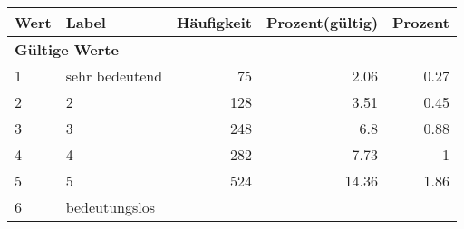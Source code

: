      \begin{longtable}{lXrrr}
     \toprule
     \textbf{Wert} & \textbf{Label} & \textbf{Häufigkeit} & \textbf{Prozent(gültig)} & \textbf{Prozent} \\
     \endhead
     \midrule
     \multicolumn{5}{l}{\textbf{Gültige Werte}}\\

     1 &
     \multicolumn{1}{X}{ sehr bedeutend   } &


       \num{75} &
       \num[round-mode=places,round-precision=2]{2.06} &
         \num[round-mode=places,round-precision=2]{0.27} \\

     2 &
     \multicolumn{1}{X}{ 2   } &


       \num{128} &
       \num[round-mode=places,round-precision=2]{3.51} &
         \num[round-mode=places,round-precision=2]{0.45} \\

     3 &
     \multicolumn{1}{X}{ 3   } &


       \num{248} &
       \num[round-mode=places,round-precision=2]{6.8} &
         \num[round-mode=places,round-precision=2]{0.88} \\

     4 &
     \multicolumn{1}{X}{ 4   } &


       \num{282} &
       \num[round-mode=places,round-precision=2]{7.73} &
         \num[round-mode=places,round-precision=2]{1} \\

     5 &
     \multicolumn{1}{X}{ 5   } &


       \num{524} &
       \num[round-mode=places,round-precision=2]{14.36} &
         \num[round-mode=places,round-precision=2]{1.86} \\

     6 &
     \multicolumn{1}{X}{ bedeutungslos   } &



\end{longtable}
